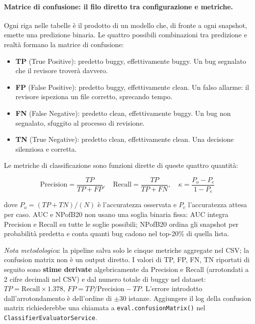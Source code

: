\paragraph{Matrice di confusione: il filo diretto tra configurazione e metriche.}

Ogni riga nelle tabelle è il prodotto di un modello che, di fronte a ogni snapshot, emette
una predizione binaria. Le quattro possibili combinazioni tra predizione e realtà formano
la matrice di confusione:

\begin{itemize}
\item \textbf{TP} (True Positive): predetto buggy, effettivamente buggy. Un bug segnalato
      che il revisore troverà davvero.
\item \textbf{FP} (False Positive): predetto buggy, effettivamente clean. Un falso allarme:
      il revisore ispeziona un file corretto, sprecando tempo.
\item \textbf{FN} (False Negative): predetto clean, effettivamente buggy. Un bug non
      segnalato, sfuggito al processo di revisione.
\item \textbf{TN} (True Negative): predetto clean, effettivamente clean. Una decisione
      silenziosa e corretta.
\end{itemize}

Le metriche di classificazione sono funzioni dirette di queste quattro quantità:

\[
\text{Precision} = \frac{TP}{TP+FP}, \quad
\text{Recall} = \frac{TP}{TP+FN}, \quad
\kappa = \frac{P_o - P_e}{1 - P_e}
\]

dove $P_o = (TP+TN)/(N)$ è l'accuratezza osservata e $P_e$ l'accuratezza attesa per
caso. AUC e NPofB20 non usano una soglia binaria fissa: AUC integra Precision e Recall
su tutte le soglie possibili; NPofB20 ordina gli snapshot per probabilità predetta e
conta quanti bug cadono nel top-20\% di quella lista.

\medskip

\textit{Nota metodologica}: la pipeline salva solo le cinque metriche aggregate nel CSV;
la confusion matrix non è un output diretto. I valori di TP, FP, FN, TN riportati di
seguito sono \textbf{stime derivate} algebricamente da Precision e Recall (arrotondati a
2 cifre decimali nel CSV) e dal numero totale di buggy nel dataset:
$TP = \text{Recall} \times 1{.}378$, $FP = TP / \text{Precision} - TP$.
L'errore introdotto dall'arrotondamento è dell'ordine di $\pm$30 istanze.
Aggiungere il log della confusion matrix richiederebbe una chiamata a
\texttt{eval.confusionMatrix()} nel \texttt{ClassifierEvaluatorService}.

